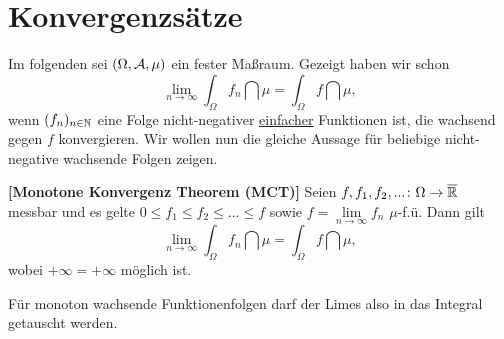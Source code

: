 \section{Konvergenzsätze}

Im folgenden sei $(\Omega, \mathcal{A}, \mu)$ ein fester Maßraum. Gezeigt haben wir schon \[ \lim_{n\to\infty}\int_{\Omega} f_n \dint \mu = \int_{\Omega} f \dint \mu, \]
wenn $(f_n)_{n\in\mathbb{N}}$ eine Folge nicht-negativer \underline{einfacher} Funktionen ist, die wachsend gegen $f$ konvergieren. Wir wollen nun die gleiche Aussage f\"ur beliebige nicht-negative wachsende Folgen zeigen.

\begin{satz}\label{allgMonKonv}
 \textbf{[Monotone Konvergenz Theorem (MCT)]}
	Seien $f,f_1,f_2,...\colon \Omega \to \overline{\mathbb{R}}$ messbar und es gelte $0\leq f_1 \leq f_2 \leq ... \leq f$ sowie $f = \lim\limits_{n \to \infty} f_n$ $\mu$-f.\"u. Dann gilt \[ \lim\limits_{n \to \infty} \int_{\Omega} f_n \dint \mu=\int_{\Omega} f \dint \mu, \]
	wobei $+\infty=+\infty$ m\"oglich ist.
\end{satz}
F\"ur monoton wachsende Funktionenfolgen darf der Limes also in das Integral getauscht werden.
